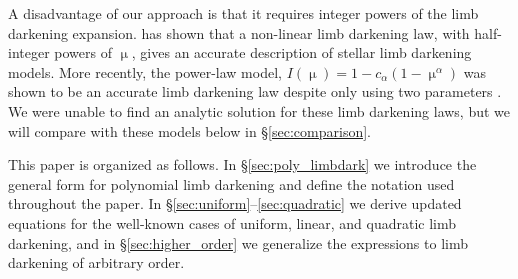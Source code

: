 \documentclass[modern]{aastex61}
\begin{document}
A disadvantage of our approach is that it requires integer powers of the limb darkening
expansion.  \citet{Claret2000} has shown that a non-linear limb darkening law,
with half-integer powers of $\upmu$, gives an accurate description of stellar
limb darkening models.  More recently, the power-law model, $I(\upmu) = 1-
c_\alpha(1-\upmu^\alpha)$ \citep{Hestroffer1997} was shown to be an accurate
limb darkening law despite only using two parameters \citep{Morello2017,Maxted2018}.  
We were unable to find an analytic solution for these limb darkening
laws, but we will compare with these models below in \S \ref{sec:comparison}.



This paper is organized as follows. In \S\ref{sec:poly_limbdark}
we introduce the general form for polynomial limb darkening 
and define the notation used throughout the paper. In \S\ref{sec:uniform}--\ref{sec:quadratic}
we derive updated equations for the well-known cases of uniform, linear, and
quadratic limb darkening, and in \S\ref{sec:higher_order} we generalize the
expressions to limb darkening of arbitrary order. 
\end{document}
